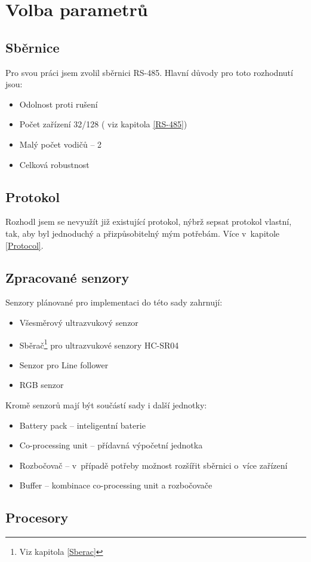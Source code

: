 \chapter{Volba parametrů}
\section{Sběrnice}
Pro svou práci jsem zvolil sběrnici RS-485.
Hlavní důvody pro toto rozhodnutí jsou:
\begin{itemize}
    \item Odolnost proti rušení
    \item Počet zařízení 32/128 ( viz kapitola \ref{RS-485})
    \item Malý počet vodičů -- 2
    \item Celková robustnost
\end{itemize}

\section{Protokol}
Rozhodl jsem se nevyužít již existující protokol, nýbrž sepsat protokol vlastní, tak, aby byl jednoduchý a přizpůsobitelný mým potřebám.
Více v~kapitole \ref{Protocol}.
\section{Zpracované senzory}
Senzory plánované pro implementaci do této sady zahrnují:
\begin{itemize}
    \item Všesměrový ultrazvukový senzor
    \item Sběrač\footnote{Viz kapitola \ref{Sberac}} pro ultrazvukové senzory HC-SR04 
    \item Senzor pro Line follower
    \item RGB senzor
    
\end{itemize}
Kromě senzorů mají být součástí sady i další jednotky:
\begin{itemize}
    \item Battery pack -- inteligentní baterie
    \item Co-processing unit -- přídavná výpočetní jednotka
    \item Rozbočovač -- v~případě potřeby možnost rozšířit sběrnici o~více zařízení
    \item Buffer -- kombinace co-processing unit a rozbočovače
\end{itemize}
\section{Procesory}

